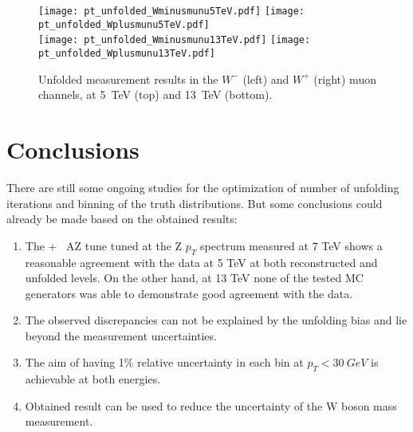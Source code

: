 \begin{figure}[h]
	\centering
	{\texttt{[image: pt\_unfolded\_Wminusmunu5TeV.pdf]}}
{\texttt{[image: pt\_unfolded\_Wplusmunu5TeV.pdf]}} \\
{\texttt{[image: pt\_unfolded\_Wminusmunu13TeV.pdf]}}
{\texttt{[image: pt\_unfolded\_Wplusmunu13TeV.pdf]}}
	\caption{Unfolded measurement results in the $W^-$ (left) and $W^+$ (right) muon channels, at 5~TeV (top) and 13~TeV (bottom).}
	\label{fig:results_predictions_muon}
\end{figure}

\section{Conclusions}

There are still some ongoing studies for the optimization of number of unfolding iterations and binning of the truth distributions. But some conclusions could already be made based on the obtained results:
\begin{enumerate}
	\item The \Powheg+\Pythia~ AZ tune tuned at the Z $p_T$ spectrum measured at 7 TeV shows a reasonable agreement with the data at 5 TeV at both reconstructed and unfolded levels. On the other hand, at 13 TeV none of the tested MC generators was able to demonstrate good agreement with the data. 
	\item The observed discrepancies can not be explained by the unfolding bias and lie beyond the measurement uncertainties.
	\item The aim of having 1\% relative uncertainty in each bin at $p_T<30~GeV$ is achievable at both energies.
	\item Obtained result can be used to reduce the uncertainty of the W boson mass measurement.
\end{enumerate}